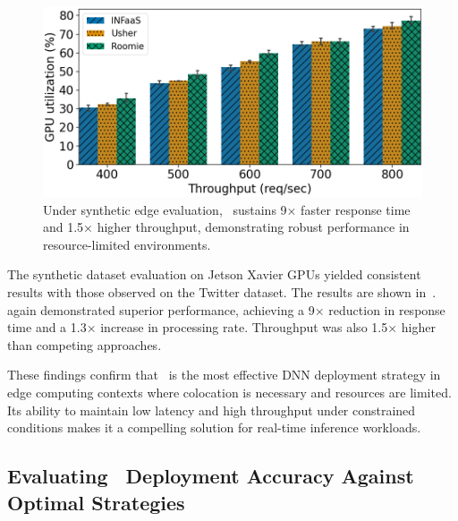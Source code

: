 \begin{figure}
\begin{minipage}[t]{.24\linewidth}
	\end{minipage}
	\hfill
	\begin{minipage}[t]{.24\linewidth}
		\centering
		\includegraphics[width=\linewidth]{chapters/roomie/images/JetsonNano/synthetic-all-models/gpu_utilization.png}
	\end{minipage}
	\caption{Under synthetic edge evaluation,~\roomie{} sustains 9× faster response time and 1.5× higher throughput, demonstrating robust performance in resource-limited environments.}
	\label{fig:JetsonNano/synthetic-all-models}
	\vspace{-3mm}
\end{figure}

The synthetic dataset evaluation on Jetson Xavier GPUs yielded consistent results with those observed on the Twitter dataset. The results are shown in~.~\roomie{} again demonstrated superior performance, achieving a 9× reduction in response time and a 1.3× increase in processing rate. Throughput was also 1.5× higher than competing approaches.

These findings confirm that~\roomie{} is the most effective DNN deployment strategy in edge computing contexts where colocation is necessary and resources are limited. Its ability to maintain low latency and high throughput under constrained conditions makes it a compelling solution for real-time inference workloads.


\subsection{Evaluating~\roomie{} Deployment Accuracy Against Optimal Strategies}

